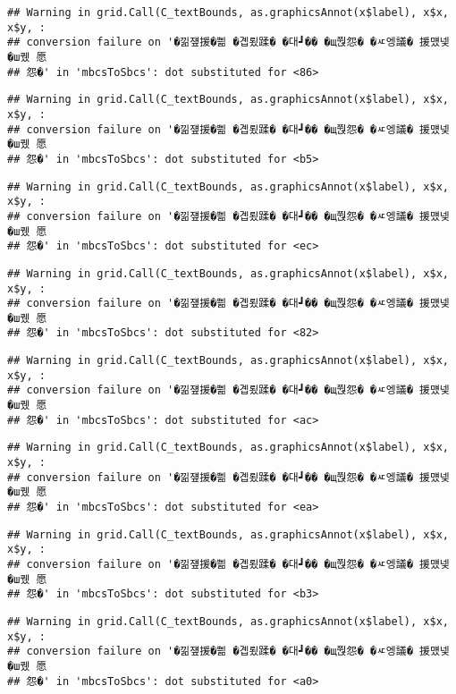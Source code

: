 \documentclass[
]{article}
\begin{document}
\begin{verbatim}
## Warning in grid.Call(C_textBounds, as.graphicsAnnot(x$label), x$x, x$y, :
## conversion failure on '�낆쟾援�쁾 �곕룄蹂� �대┛�� �щ쭩怨� �ㅼ엥議� 援먰넻�ш퀬 愿
## 怨�' in 'mbcsToSbcs': dot substituted for <86>
\end{verbatim}

\begin{verbatim}
## Warning in grid.Call(C_textBounds, as.graphicsAnnot(x$label), x$x, x$y, :
## conversion failure on '�낆쟾援�쁾 �곕룄蹂� �대┛�� �щ쭩怨� �ㅼ엥議� 援먰넻�ш퀬 愿
## 怨�' in 'mbcsToSbcs': dot substituted for <b5>
\end{verbatim}

\begin{verbatim}
## Warning in grid.Call(C_textBounds, as.graphicsAnnot(x$label), x$x, x$y, :
## conversion failure on '�낆쟾援�쁾 �곕룄蹂� �대┛�� �щ쭩怨� �ㅼ엥議� 援먰넻�ш퀬 愿
## 怨�' in 'mbcsToSbcs': dot substituted for <ec>
\end{verbatim}

\begin{verbatim}
## Warning in grid.Call(C_textBounds, as.graphicsAnnot(x$label), x$x, x$y, :
## conversion failure on '�낆쟾援�쁾 �곕룄蹂� �대┛�� �щ쭩怨� �ㅼ엥議� 援먰넻�ш퀬 愿
## 怨�' in 'mbcsToSbcs': dot substituted for <82>
\end{verbatim}

\begin{verbatim}
## Warning in grid.Call(C_textBounds, as.graphicsAnnot(x$label), x$x, x$y, :
## conversion failure on '�낆쟾援�쁾 �곕룄蹂� �대┛�� �щ쭩怨� �ㅼ엥議� 援먰넻�ш퀬 愿
## 怨�' in 'mbcsToSbcs': dot substituted for <ac>
\end{verbatim}

\begin{verbatim}
## Warning in grid.Call(C_textBounds, as.graphicsAnnot(x$label), x$x, x$y, :
## conversion failure on '�낆쟾援�쁾 �곕룄蹂� �대┛�� �щ쭩怨� �ㅼ엥議� 援먰넻�ш퀬 愿
## 怨�' in 'mbcsToSbcs': dot substituted for <ea>
\end{verbatim}

\begin{verbatim}
## Warning in grid.Call(C_textBounds, as.graphicsAnnot(x$label), x$x, x$y, :
## conversion failure on '�낆쟾援�쁾 �곕룄蹂� �대┛�� �щ쭩怨� �ㅼ엥議� 援먰넻�ш퀬 愿
## 怨�' in 'mbcsToSbcs': dot substituted for <b3>
\end{verbatim}

\begin{verbatim}
## Warning in grid.Call(C_textBounds, as.graphicsAnnot(x$label), x$x, x$y, :
## conversion failure on '�낆쟾援�쁾 �곕룄蹂� �대┛�� �щ쭩怨� �ㅼ엥議� 援먰넻�ш퀬 愿
## 怨�' in 'mbcsToSbcs': dot substituted for <a0>
\end{verbatim}
\end{document}
